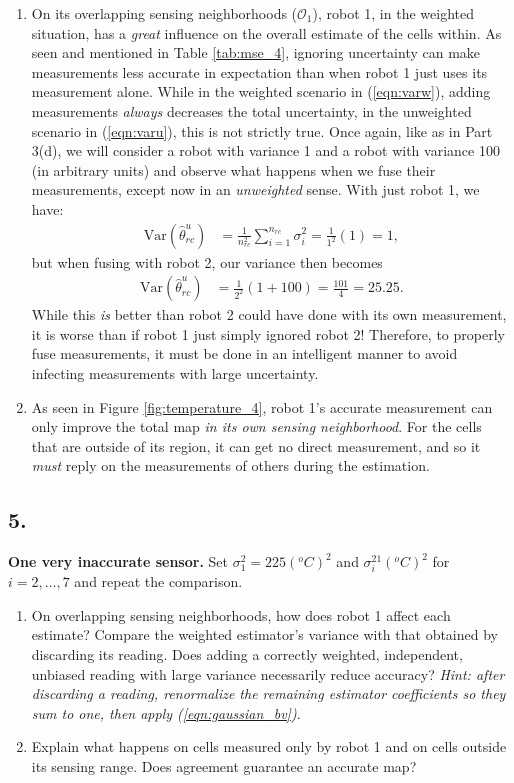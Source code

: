 \documentclass[12pt]{article}
\begin{document}
\begin{enumerate}[label=(\alph*)]
    \item On its overlapping sensing neighborhoods ($\mathcal O_1$), robot 1, in the weighted situation, has a \textit{great} influence on the overall estimate of the cells within. As seen and mentioned in Table \ref{tab:mse_4}, ignoring uncertainty can make measurements less accurate in expectation than when robot 1 just uses its measurement alone. While in the weighted scenario in (\ref{eqn:varw}), adding measurements \textit{always} decreases the total uncertainty, in the unweighted scenario in (\ref{eqn:varu}), this is not strictly true. Once again, like as in Part 3(d), we will consider a robot with variance 1 and a robot with variance 100 (in arbitrary units)  and observe what happens when we fuse their measurements, except now in an \textit{unweighted} sense. With just robot 1, we have:
    \begin{align*}
        \text{Var}(\hat\theta_{rc}^u)&=\frac{1}{n_{rc}^2}\sum_{i=1}^{n_{rc}}\sigma_i^2=\frac1{1^2}(1)=1,
    \end{align*}
    but when fusing with robot 2, our variance then becomes
    \begin{align*}
        \text{Var}(\hat\theta_{rc}^u)&=\frac{1}{2^2}(1+100)=\frac{101}{4}=25.25.
    \end{align*}
    While this \textit{is} better than robot 2 could have done with its own measurement, it is worse than if robot 1 just simply ignored robot 2! Therefore, to properly fuse measurements, it must be done in an intelligent manner to avoid infecting measurements with large uncertainty.

    \item As seen in Figure \ref{fig:temperature_4}, robot 1's accurate measurement can only improve the total map \textit{in its own sensing neighborhood}. For the cells that are outside of its region, it can get no direct measurement, and so it \textit{must} reply on the measurements of others during the estimation.
\end{enumerate}

\clearpage
\subsection*{5.}
\textbf{One very inaccurate sensor.}
Set $\sigma_1^2=225(^oC)^2$ and $\sigma_i^21(^oC)^2$ for $i=2,\dots,7$ and repeat the comparison.
\begin{enumerate}[label=(\alph*)]
    \item On overlapping sensing neighborhoods, how does robot 1 affect each estimate? Compare the weighted estimator's variance with that obtained by discarding its reading. Does adding a correctly weighted, independent, unbiased reading with large variance necessarily reduce accuracy? \textit{Hint: after discarding a reading, renormalize the remaining estimator coefficients so they sum to one, then apply (\ref{eqn:gaussian_bv})}.
    \item Explain what happens on cells measured only by robot 1 and on cells outside its sensing range. Does agreement guarantee an accurate map?
\end{enumerate}
\end{document}
